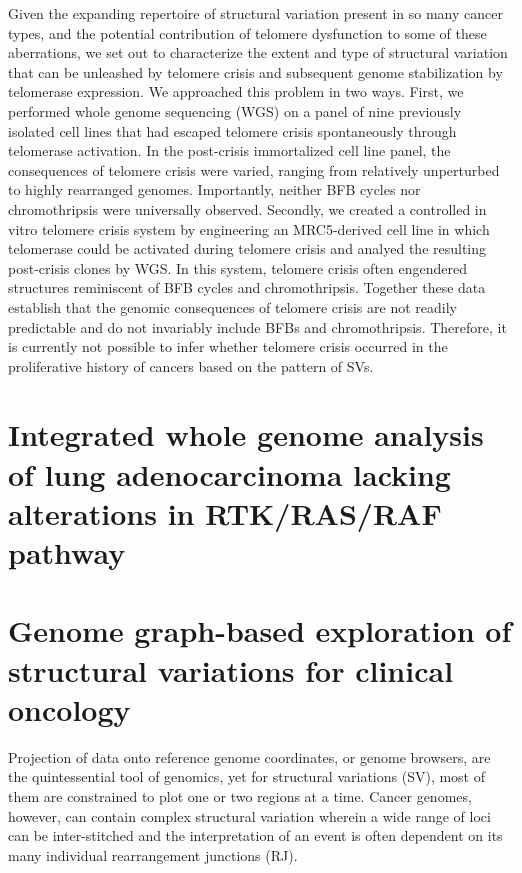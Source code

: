 \documentclass[phd,tocprelim]{cornell}
\begin{document}
Given the expanding repertoire of structural variation present in so many cancer types, and the potential contribution of telomere dysfunction to some of these aberrations, we set out to characterize the extent and type of structural variation that can be unleashed by telomere crisis and subsequent genome stabilization by telomerase expression. We approached this problem in two ways. First, we performed whole genome sequencing (WGS) on a panel of nine previously isolated cell lines that had escaped telomere crisis spontaneously through telomerase activation. In the post-crisis immortalized cell line panel, the consequences of telomere crisis were varied, ranging from relatively unperturbed to highly rearranged genomes. Importantly, neither BFB cycles nor chromothripsis were universally observed. Secondly, we created a controlled in vitro telomere crisis system by engineering an MRC5-derived cell line in which telomerase could be activated during telomere crisis and analyed the resulting post-crisis clones by WGS.  In this system, telomere crisis often engendered structures reminiscent of BFB cycles and chromothripsis. Together these data establish that the genomic consequences of telomere crisis are not readily predictable and do not invariably include BFBs and chromothripsis. Therefore, it is currently not possible to infer whether telomere crisis occurred in the proliferative history of cancers based on the pattern of SVs. 


\section{Integrated whole genome analysis of lung adenocarcinoma lacking alterations in RTK/RAS/RAF pathway}


\section{Genome graph-based exploration of structural variations for clinical oncology}

Projection of data onto reference genome coordinates, or genome browsers, are the quintessential tool of genomics, yet for structural variations (SV), most of them are constrained to plot one or two regions at a time. Cancer genomes, however, can contain complex structural variation wherein a wide range of loci can be inter-stitched and the interpretation of an event is often dependent on its many individual rearrangement junctions (RJ).

\end{document}
